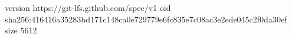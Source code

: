 version https://git-lfs.github.com/spec/v1
oid sha256:416416a35283bd171c148ca0e729779e6fc835e7c08ac3e2ede045c2f0da30ef
size 5612
